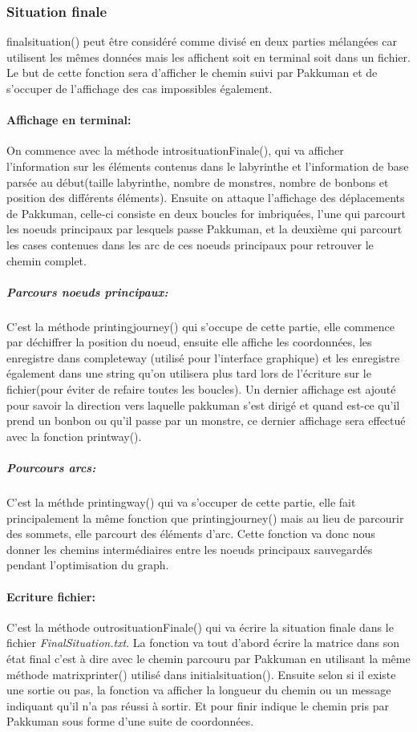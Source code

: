 \documentclass[12pt, oneside]{article}
\begin{document}
\subsubsection{Situation finale}
final\textunderscore situation() peut être considéré comme divisé en deux parties mélangées car utilisent les mêmes données mais les affichent soit en terminal soit dans un fichier. Le but de cette fonction sera d'afficher le chemin suivi par Pakkuman et de s'occuper de l'affichage des cas impossibles également.

\paragraph{Affichage en terminal:}
On commence avec la méthode intro\textunderscore situationFinale(), qui va afficher l'information sur les éléments contenus dans le labyrinthe et l'information de base parsée au début(taille labyrinthe, nombre de monstres, nombre de bonbons et position des différents éléments).
Ensuite on attaque l'affichage des déplacements de Pakkuman, celle-ci consiste en deux boucles for imbriquées, l'une qui parcourt les noeuds principaux par lesquels passe Pakkuman, et la deuxième qui parcourt les cases contenues dans les arc de ces noeuds principaux pour retrouver le chemin complet.

\subparagraph{Parcours noeuds principaux:}
C'est la méthode printing\textunderscore journey() qui s'occupe de cette partie, elle commence par déchiffrer la position du noeud, ensuite elle affiche les coordonnées, les enregistre dans complete\textunderscore way (utilisé pour l'interface graphique) et les enregistre également dans une string qu'on utilisera plus tard lors de l'écriture sur le fichier(pour éviter de refaire toutes les boucles). Un dernier affichage est ajouté pour savoir la direction vers laquelle pakkuman s'est dirigé et quand est-ce qu'il prend un bonbon ou qu'il passe par un monstre, ce dernier affichage sera effectué avec la fonction print\textunderscore way().

\subparagraph{Pourcours arcs:}
C'est la méthde printing\textunderscore way() qui va s'occuper de cette partie, elle fait principalement la même fonction que printing\textunderscore journey() mais au lieu de parcourir des sommets, elle parcourt des éléments d'arc.
Cette fonction va donc nous donner les chemins intermédiaires entre les noeuds principaux sauvegardés pendant l'optimisation du graph.

\paragraph{Ecriture fichier:}
C'est la méthode outro\textunderscore situationFinale() qui va écrire la situation finale dans le fichier \emph{FinalSituation.txt}. La fonction va tout d'abord écrire la matrice dans son état final c'est à dire avec le chemin parcouru par Pakkuman en utilisant la même méthode matrix\textunderscore printer() utilisé dans initial\textunderscore situation(). Ensuite selon si il existe une sortie ou pas, la fonction va afficher la longueur du chemin ou un message indiquant qu'il n'a pas réussi à sortir. Et pour finir indique le chemin pris par Pakkuman sous forme d'une suite de coordonnées.
\end{document}
